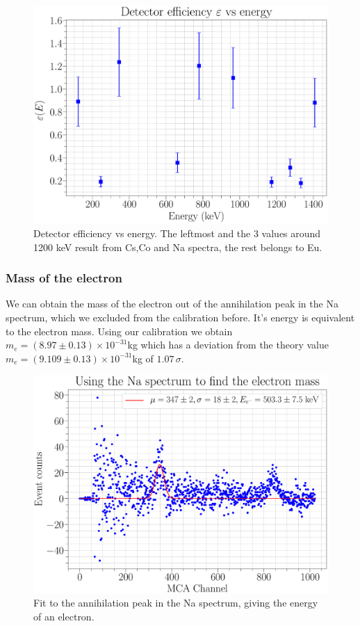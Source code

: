 \documentclass[a4paper,12pt]{article}
\begin{document}
\begin{figure}[H]
	\centering
	\includegraphics[scale=0.3]{../Figures/Efficiency.eps}
	\caption{Detector efficiency vs energy. The leftmost and the 3 values around 1200 keV result from Cs,Co and Na spectra, the rest belongs to Eu.}
	\label{efficiency}
\end{figure}

\subsubsection{Mass of the electron}
We can obtain the mass of the electron out of the annihilation peak in the Na spectrum, which we excluded from the calibration before. It's energy is equivalent to the electron mass. 
Using our calibration we obtain $m_e = (8.97 \pm 0.13) \times 10^{-31}$kg which has a deviation from the theory value $m_e = (9.109 \pm 0.13) \times 10^{-31}$kg of $1.07 \, \sigma$.

\begin{figure}[H]
	\centering
	\includegraphics[scale=0.25]{../Figures/Na_me.eps}
	\caption{Fit to the annihilation peak in the Na spectrum, giving the energy of an electron.}
	\label{efficiency}
\end{figure}
\end{document}
